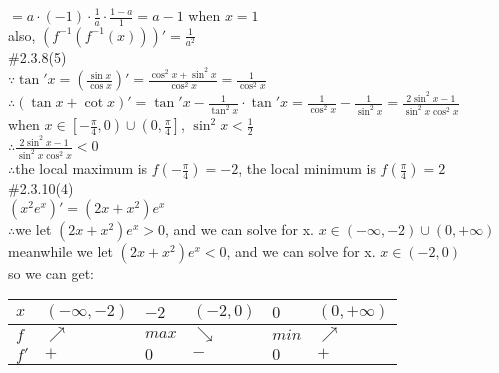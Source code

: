 \documentclass{article}
\begin{document}
\qquad\qquad\qquad\qquad\qquad$=a\cdot(-1)\cdot\displaystyle\frac{1}{a}\cdot\frac{1-a}{1}=a-1$ when $x=1$\\

also, $\left(f^{-1}(f^{-1}(x))\right)'=\displaystyle\frac{1}{a^2}$\\

\textcolor[rgb]{0.00,0.00,0.50}{\#2.3.8(5)}\\

$\because$\qquad$\tan'x=\left(\displaystyle\frac{\sin x}{\cos x}\right)'=\frac{\cos^2x+\sin^2x}{\cos^2x}=\frac{1}{\cos^2x}$\\

$\therefore$\qquad$(\tan x+\cot x)'=\tan'x-\frac{1}{\tan^2x}\cdot\tan'x=\displaystyle\frac{1}{\cos^2x}-\frac{1}{\sin^2x}=\frac{2\sin^2x-1}{\sin^2x\cos^2x}$\\

when $x\in\left[\displaystyle-\frac{\pi}{4},0\right)\cup\left(0,\frac{\pi}{4}\right]$, $\sin^2x<\displaystyle\frac{1}{2}$\\

$\therefore$\qquad$\displaystyle\frac{2\sin^2x-1}{\sin^2x\cos^2x}<0$\\

$\therefore$\qquad the local maximum is $\displaystyle f(-\frac{\pi}{4})=-2$, the local minimum is $\displaystyle f(\frac{\pi}{4})=2$\\

\textcolor[rgb]{0.00,0.00,0.50}{\#2.3.10(4)}\\

$(x^2e^x)'=(2x+x^2)e^x$\\

$\therefore$\qquad we let $(2x+x^2)e^x>0$, and we can solve for x. $x\in(-\infty,-2)\cup(0,+\infty)$\\

meanwhile we let $(2x+x^2)e^x<0$, and we can solve for x. $x\in(-2,0)$\\

so we can get:\\

\begin{tabular}{|l|l|l|l|l|l|}
  \hline
  $x$ & $(-\infty,-2)$ & $-2$ & $(-2,0)$ & $0$ & $(0,+\infty)$\\ \hline
  $f$ & $\nearrow$ & $max$ & $\searrow$ & $min$ & $\nearrow$\\ \hline
  $f'$ & $+$ & $0$ & $-$ & $0$ & $+$\\
  \hline
\end{tabular}\\
\end{document}
